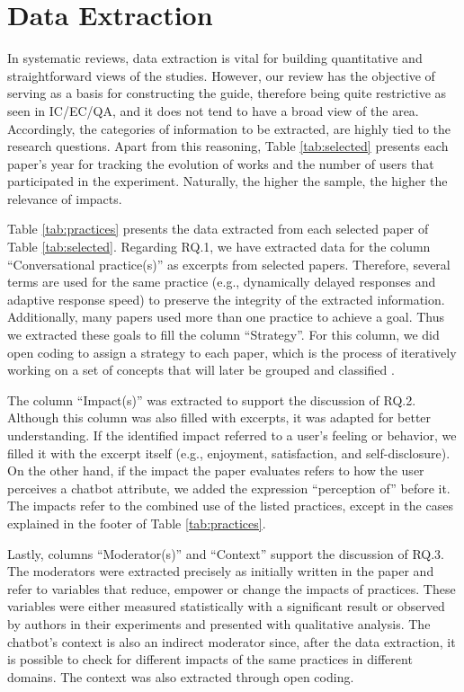 \section{Data Extraction}\label{sec:data_extraction}

In systematic reviews, data extraction is vital for building quantitative and straightforward views of the studies. However, our review has the objective of serving as a basis for constructing the guide, therefore being quite restrictive as seen in IC/EC/QA, and it does not tend to have a broad view of the area. Accordingly, the categories of information to be extracted, are highly tied to the research questions. Apart from this reasoning, Table \ref{tab:selected} presents each paper's year for tracking the evolution of works and the number of users that participated in the experiment. Naturally, the higher the sample, the higher the relevance of impacts.

Table \ref{tab:practices} presents the data extracted from each selected paper of Table \ref{tab:selected}. Regarding RQ.1, we have extracted data for the column ``Conversational practice(s)'' as excerpts from selected papers. Therefore, several terms are used for the same practice (e.g., dynamically delayed responses and adaptive response speed) to preserve the integrity of the extracted information. Additionally, many papers used more than one practice to achieve a goal. Thus we extracted these goals to fill the column ``Strategy''. For this column, we did open coding to assign a strategy to each paper, which is the process of iteratively working on a set of concepts that will later be grouped and classified \cite{Wolfswinkel2013}.

The column ``Impact(s)'' was extracted to support the discussion of RQ.2. Although this column was also filled with excerpts, it was adapted for better understanding. If the identified impact referred to a user's feeling or behavior, we filled it with the excerpt itself (e.g., enjoyment, satisfaction, and self-disclosure). On the other hand, if the impact the paper evaluates refers to how the user perceives a chatbot attribute, we added the expression ``perception of'' before it. The impacts refer to the combined use of the listed practices, except in the cases explained in the footer of Table \ref{tab:practices}.

Lastly, columns ``Moderator(s)'' and ``Context'' support the discussion of RQ.3. The moderators were extracted precisely as initially written in the paper and refer to variables that reduce, empower or change the impacts of practices. These variables were either measured statistically with a significant result or observed by authors in their experiments and presented with qualitative analysis. The chatbot's context is also an indirect moderator since, after the data extraction, it is possible to check for different impacts of the same practices in different domains. The context was also extracted through open coding.

